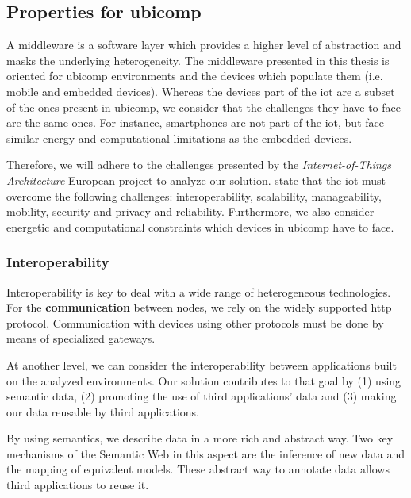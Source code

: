 \subsection{Properties for \acs{ubicomp}}
\label{sec:middleware_properties}

A middleware is a software layer which provides a higher level of abstraction and masks the underlying heterogeneity.
The middleware presented in this thesis is oriented for \ac{ubicomp} environments and the devices which populate them (i.e. mobile and embedded devices).
Whereas the devices part of the \ac{iot} are a subset of the ones present in \ac{ubicomp}, we consider that the challenges they have to face are the same ones.
For instance, smartphones are not part of the \ac{iot}, but face similar energy and computational limitations as the embedded devices. %

Therefore, we will adhere to the challenges presented by the \emph{Internet-of-Things Architecture} European project \citep{walewski_project_2011} to analyze our solution.
\citeauthor{walewski_project_2011} state that the \ac{iot} must overcome the following challenges:
interoperability, scalability, manageability, mobility, security and privacy and reliability.
Furthermore, we also consider energetic and computational constraints which devices in \ac{ubicomp} have to face. %


\subsubsection{Interoperability}

Interoperability is key to deal with a wide range of heterogeneous technologies.
For the \textbf{communication} between nodes, we rely on the widely supported \ac{http} protocol. %
Communication with devices using other protocols must be done by means of specialized gateways. %


At another level, we can consider the interoperability between applications built on the analyzed environments.
Our solution contributes to that goal by
(1) using semantic data,
(2) promoting the use of third applications' data and 
(3) making our data reusable by third applications. %

By using semantics, we describe data in a more rich and abstract way.
Two key mechanisms of the Semantic Web in this aspect are the inference of new data and the mapping of equivalent models.
These abstract way to annotate data allows third applications to reuse it.

